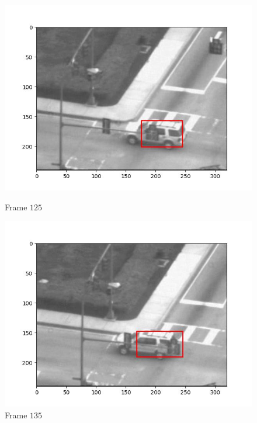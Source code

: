 \begin{figure}[H]
  \centering
  \begin{minipage}{.49\textwidth}
    \centering
    \includegraphics[width=\textwidth]{./figures/ic_affine/car2/frame000125.jpg}
    \caption{Frame $125$}
  \end{minipage}
  \hfill
  \begin{minipage}{.49\textwidth}
    \centering
    \includegraphics[width=\textwidth]{./figures/ic_affine/car2/frame000135.jpg}
    \caption{Frame $135$}
  \end{minipage}
  \hfill
  \begin{minipage}{.49\textwidth}
    \centering

\end{minipage}
\end{figure}
